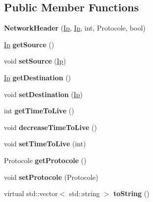 \subsection*{Public Member Functions}
\begin{DoxyCompactItemize}
\item 
\hypertarget{class_network_header_ab5b8c63834cbaa5261dac88a0ca796c9}{{\bfseries Network\-Header} (\hyperlink{class_ip}{Ip}, \hyperlink{class_ip}{Ip}, int, Protocole, bool)}\label{class_network_header_ab5b8c63834cbaa5261dac88a0ca796c9}

\item 
\hypertarget{class_network_header_a9425d6738b39718257c24ef7280868d1}{\hyperlink{class_ip}{Ip} {\bfseries get\-Source} ()}\label{class_network_header_a9425d6738b39718257c24ef7280868d1}

\item 
\hypertarget{class_network_header_a6b9ebd8cead399a67e192438c96c8ef7}{void {\bfseries set\-Source} (\hyperlink{class_ip}{Ip})}\label{class_network_header_a6b9ebd8cead399a67e192438c96c8ef7}

\item 
\hypertarget{class_network_header_a8b5a619c715e622d4000f5f63c6a71ec}{\hyperlink{class_ip}{Ip} {\bfseries get\-Destination} ()}\label{class_network_header_a8b5a619c715e622d4000f5f63c6a71ec}

\item 
\hypertarget{class_network_header_a237d89c5c777fd041e6f4df6276221cd}{void {\bfseries set\-Destination} (\hyperlink{class_ip}{Ip})}\label{class_network_header_a237d89c5c777fd041e6f4df6276221cd}

\item 
\hypertarget{class_network_header_a897fc5250027e25c0bc62f349dbbc8e2}{int {\bfseries get\-Time\-To\-Live} ()}\label{class_network_header_a897fc5250027e25c0bc62f349dbbc8e2}

\item 
\hypertarget{class_network_header_a5d83ca343d7c591fd1a7fc20c3299bb7}{void {\bfseries decrease\-Time\-To\-Live} ()}\label{class_network_header_a5d83ca343d7c591fd1a7fc20c3299bb7}

\item 
\hypertarget{class_network_header_aa2a108851cae7f1f9f7de323ec651073}{void {\bfseries set\-Time\-To\-Live} (int)}\label{class_network_header_aa2a108851cae7f1f9f7de323ec651073}

\item 
\hypertarget{class_network_header_a3330d82e84bac90093f4b2b32c1542b7}{Protocole {\bfseries get\-Protocole} ()}\label{class_network_header_a3330d82e84bac90093f4b2b32c1542b7}

\item 
\hypertarget{class_network_header_ae4dda57cc84ce18cfeff84494c07b0ec}{void {\bfseries set\-Protocole} (Protocole)}\label{class_network_header_ae4dda57cc84ce18cfeff84494c07b0ec}

\item 
\hypertarget{class_network_header_a3c1e1af854954747d9c2dcce455e67f0}{virtual std\-::vector$<$ std\-::string $>$ {\bfseries to\-String} ()}\label{class_network_header_a3c1e1af854954747d9c2dcce455e67f0}

\end{DoxyCompactItemize}
